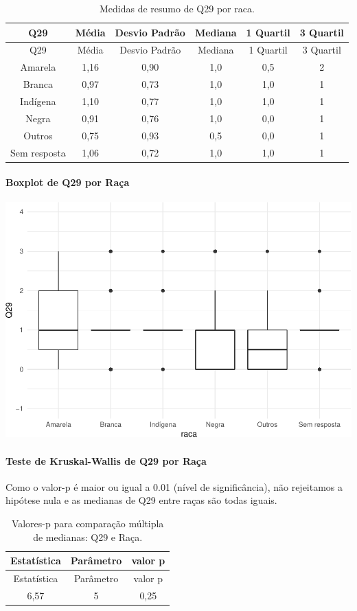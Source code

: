 \documentclass[]{article}
\let\oldparagraph\paragraph
\renewcommand{\paragraph}[1]{\oldparagraph{#1}\mbox{}}
\begin{document}
\begin{longtable}[]{@{}cccccc@{}}
\caption{\label{tab:unnamed-chunk-932}Medidas de resumo de Q29 por raca.}\tabularnewline
\toprule
Q29 & Média & Desvio Padrão & Mediana & 1 Quartil & 3 Quartil\tabularnewline
\midrule
\endfirsthead
\toprule
Q29 & Média & Desvio Padrão & Mediana & 1 Quartil & 3 Quartil\tabularnewline
\midrule
\endhead
Amarela & 1,16 & 0,90 & 1,0 & 0,5 & 2\tabularnewline
Branca & 0,97 & 0,73 & 1,0 & 1,0 & 1\tabularnewline
Indígena & 1,10 & 0,77 & 1,0 & 1,0 & 1\tabularnewline
Negra & 0,91 & 0,76 & 1,0 & 0,0 & 1\tabularnewline
Outros & 0,75 & 0,93 & 0,5 & 0,0 & 1\tabularnewline
Sem resposta & 1,06 & 0,72 & 1,0 & 1,0 & 1\tabularnewline
\bottomrule
\end{longtable}

\hypertarget{boxplot-de-q29-por-rauxe7a}{%
\paragraph{Boxplot de Q29 por Raça}\label{boxplot-de-q29-por-rauxe7a}}

\begin{center}\includegraphics[width=0.75\linewidth]{relatorio_covid19_files/figure-latex/unnamed-chunk-933-1} \end{center}

\hypertarget{teste-de-kruskal-wallis-de-q29-por-rauxe7a}{%
\paragraph{Teste de Kruskal-Wallis de Q29 por Raça}\label{teste-de-kruskal-wallis-de-q29-por-rauxe7a}}

Como o valor-p é maior ou igual a 0.01 (nível de significância), não rejeitamos a hipótese nula e as medianas de Q29 entre raças são todas iguais.

\begin{longtable}[]{@{}ccc@{}}
\caption{\label{tab:unnamed-chunk-935}Valores-p para comparação múltipla de medianas: Q29 e Raça.}\tabularnewline
\toprule
Estatística & Parâmetro & valor p\tabularnewline
\midrule
\endfirsthead
\toprule
Estatística & Parâmetro & valor p\tabularnewline
\midrule
\endhead
6,57 & 5 & 0,25\tabularnewline
\bottomrule
\end{longtable}
\end{document}
